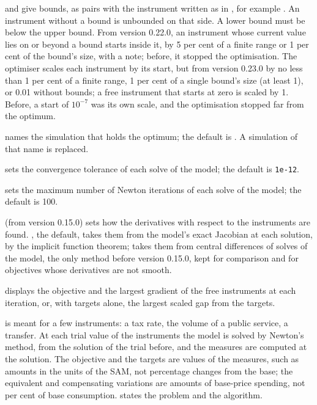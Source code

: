 \begin{optdesc}
\item[\optarg{low}{er}{spec}] and  give bounds, as
\cmd{:} pairs with the instrument written as in
, for example
. An instrument without a
bound is unbounded on that side. A lower bound must be below the upper
bound. From version 0.22.0, an instrument whose current value lies on or
beyond a bound starts inside it, by 5 per cent of a finite range or 1 per
cent of the bound's size, with a note; before, it stopped the optimisation.
The optimiser scales each instrument by its start, but from version 0.23.0
by no less than 1 per cent of a finite range, 1 per cent of a single bound's
size (at least 1), or 0.01 without bounds; a free instrument that starts at
zero is scaled by 1. Before, a start of $10^{-7}$ was its own scale, and the
optimisation stopped far from the optimum.

\item[\optarg{}{name}{name}] names the simulation that holds the optimum;
the default is . A simulation of that name is replaced.

\item[\optarg{tol}{erance}{\#}] sets the convergence tolerance of each solve
of the model; the default is \texttt{1e-12}.

\item[\optarg{iter}{ate}{\#}] sets the maximum number of Newton iterations of
each solve of the model; the default is 100.

\item[\optarg{grad}{ient}{method}] (from version 0.15.0) sets how the
derivatives with respect to the instruments are found. , the
default, takes them from the model's exact Jacobian at each solution, by the
implicit function theorem;  takes them from central
differences of solves of the model, the only method before version 0.15.0,
kept for comparison and for objectives whose derivatives are not smooth.

\item[\opt{}{trace}] displays the objective and the largest gradient of the
free instruments at each iteration, or, with targets alone, the largest
scaled gap from the targets.
\end{optdesc}


 is meant for a few instruments: a tax rate, the volume of
a public service, a transfer. At each trial value of the instruments the
model is solved by Newton's method, from the solution of the trial before,
and the measures are computed at the solution. The objective and the targets
are values of the measures, such as amounts in the units of the SAM, not
percentage changes from the base; the equivalent and compensating variations
are amounts of base-price spending, not per cent of base consumption.
 states the problem and the algorithm.

